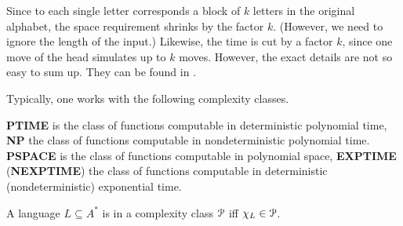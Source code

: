 Since to each single letter corresponds a block of $k$
letters in the original alphabet, the space requirement
shrinks by the factor $k$. (However, we need to ignore the
length of the input.) Likewise, the time is cut by a factor
$k$, since one move of the head simulates up to $k$ moves.
However, the exact details are not so easy to sum up.
They can be found in \cite{hopcroftullman:formal}.

Typically, one works with the following complexity classes.
\begin{defn}
\textbf{PTIME} is the class of functions computable in
deterministic polynomial time, \textbf{NP} the class
of functions computable in nondeterministic polynomial
time. \textbf{PSPACE} is the class of functions computable
in polynomial space, \textbf{EXPTIME} (\textbf{NEXPTIME}) the
class of functions computable in deterministic (nondeterministic)
exponential time.
\end{defn}
\begin{defn}
\label{defn:complang}
A language $L \subseteq A^{\ast}$ is in a complexity class $\mathcal{P}$
iff $\chi_L \in \mathcal{P}$.
\end{defn}
\mbox{}

